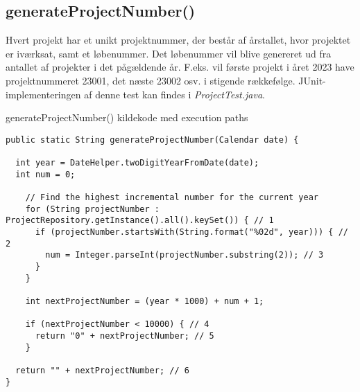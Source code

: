 \subsection{generateProjectNumber()} \label{sec:white_box_generate_project_number}
Hvert projekt har et unikt projektnummer, der består af årstallet, hvor projektet er iværksat, samt et løbenummer. Det løbenummer vil blive genereret ud fra antallet af projekter i det pågældende år. F.eks. vil første projekt i året 2023 have projektnummeret 23001, det næste 23002 osv. i stigende rækkefølge. JUnit-implementeringen af denne test kan findes i \textit{ProjectTest.java}.

\begin{listing}[H]
    \centering
    \caption{generateProjectNumber() kildekode med execution paths}\label{lst:generate_project_number}
    \begin{verbatim}
public static String generateProjectNumber(Calendar date) {

  int year = DateHelper.twoDigitYearFromDate(date);
  int num = 0;

    // Find the highest incremental number for the current year
    for (String projectNumber : ProjectRepository.getInstance().all().keySet()) { // 1
      if (projectNumber.startsWith(String.format("%02d", year))) { // 2
        num = Integer.parseInt(projectNumber.substring(2)); // 3
      }
    }

    int nextProjectNumber = (year * 1000) + num + 1;

    if (nextProjectNumber < 10000) { // 4
      return "0" + nextProjectNumber; // 5
    }

  return "" + nextProjectNumber; // 6
}
    \end{verbatim}
\end{listing}


